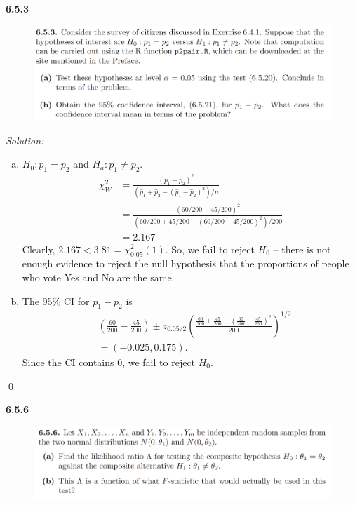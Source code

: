 \documentclass{book}
\theoremstyle{definition}
\newcommand{\nn}{\nonumber}
\newcommand{\f}[2]{\frac{#1}{#2}}
\newcommand{\lp}{\left(}
\newcommand{\rp}{\right)}
\begin{document}
\newpage
\noindent \textbf{6.5.3}
\begin{figure}[!htb]
	\centering
	\includegraphics[scale=0.6]{653}
\end{figure}


\noindent \textit{Solution:} 
\begin{enumerate}[(a)]
	\item $H_0 : p_1 = p_2$ and $H_a : p_1 \neq p_2$. 
	\begin{align}
	\chi^2_W &= \f{(\hat{p}_1 - \hat{p}_2)^2}{(\hat{p}_1 + \hat{p}_2 - (\hat{p}_1 - \hat{p}_2)^2 )/n} \nn\\
	&= \f{(60/200 - 45/200)^2}{(60/200 + 45/200 - (60/200 - 45/200)^2 )/200}\nn\\
	&= \boxed{2.167}
	\end{align}
	Clearly, $2.167 < 3.81 = \chi^2_{0.05}(1)$. So, we fail to reject $H_0$ -- there is not enough evidence to reject the null hypothesis that the proportions of people who vote Yes and No are the same.
	
	
	
	\item The 95\% CI for $p_1 - p_2$ is 
	\begin{align}
	&\lp \f{60}{200} - \f{45}{200} \rp \pm z_{0.05/2}\lp \f{\f{60}{200} + \f{45}{200} - \lp \f{60}{200} - \f{45}{200} \rp^2}{200} \rp^{1/2}\\
	&= \lp   -0.025  ,  0.175  \rp.
	\end{align}
	Since the CI contains 0, we fail to reject $H_0$. 
	
	
\end{enumerate}\qed












\newpage
\noindent \textbf{6.5.6}
\begin{figure}[!htb]
	\centering
	\includegraphics[scale=0.6]{656}
\end{figure}
\end{document}
